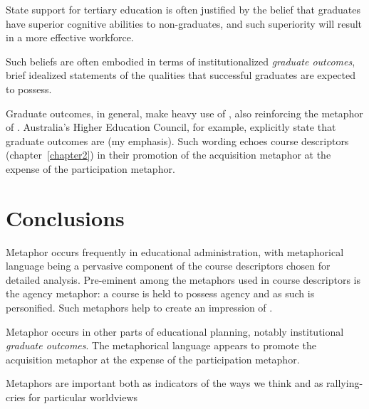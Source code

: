 State support for tertiary education is often justified by the belief
that graduates have superior cognitive abilities to non-graduates, and
such superiority will result in a more effective workforce.

Such beliefs are often embodied in terms of institutionalized
\emph{graduate outcomes}, brief idealized statements of the qualities
that successful graduates are expected to possess.

Graduate outcomes, in general, make heavy use of , also reinforcing the 
metaphor of .  Australia's Higher Education Council,
for example, explicitly state that graduate outcomes are  (my emphasis).  Such wording echoes course
descriptors (chapter~\ref{chapter2}) in their promotion of the
acquisition metaphor at the expense of the participation metaphor.

\section{Conclusions}

Metaphor occurs frequently in educational administration, with
metaphorical language being a pervasive component of the course
descriptors chosen for detailed analysis.  Pre-eminent among the
metaphors used in course descriptors is the agency metaphor: a course
is held to possess agency and as such is personified.  Such metaphors
help to create an impression of .

Metaphor occurs in other parts of educational planning, notably
institutional \emph{graduate outcomes}.  The metaphorical language
appears to promote the acquisition metaphor at the expense of the
participation metaphor.


\begin{singlespace}
\epigraph{Metaphors are important both as indicators of the ways we
  think and as rallying-cries for particular
  worldviews}{}
\end{singlespace}
